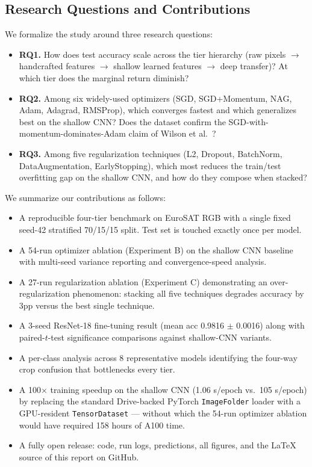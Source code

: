 \documentclass[10pt,letterpaper]{article}
\begin{document}
\subsection{Research Questions and Contributions}
We formalize the study around three research questions:
\begin{itemize}[leftmargin=2em]
    \item \textbf{RQ1.} How does test accuracy scale across the tier hierarchy (raw pixels $\rightarrow$ handcrafted features $\rightarrow$ shallow learned features $\rightarrow$ deep transfer)? At which tier does the marginal return diminish?
    \item \textbf{RQ2.} Among six widely-used optimizers (SGD, SGD+Momentum, NAG, Adam, Adagrad, RMSProp), which converges fastest and which generalizes best on the shallow CNN? Does the dataset confirm the SGD-with-momentum-dominates-Adam claim of Wilson et al.~\cite{wilson2017}?
    \item \textbf{RQ3.} Among five regularization techniques (L2, Dropout, BatchNorm, DataAugmentation, EarlyStopping), which most reduces the train/test overfitting gap on the shallow CNN, and how do they compose when stacked?
\end{itemize}

We summarize our contributions as follows:
\begin{itemize}[leftmargin=2em]
    \item A reproducible four-tier benchmark on EuroSAT RGB with a single fixed seed-42 stratified 70/15/15 split. Test set is touched exactly once per model.
    \item A 54-run optimizer ablation (Experiment B) on the shallow CNN baseline with multi-seed variance reporting and convergence-speed analysis.
    \item A 27-run regularization ablation (Experiment C) demonstrating an over-regularization phenomenon: stacking all five techniques degrades accuracy by 3pp versus the best single technique.
    \item A 3-seed ResNet-18 fine-tuning result (mean acc 0.9816 $\pm$ 0.0016) along with paired-$t$-test significance comparisons against shallow-CNN variants.
    \item A per-class analysis across 8 representative models identifying the four-way crop confusion that bottlenecks every tier.
    \item A 100$\times$ training speedup on the shallow CNN (1.06 s/epoch vs.\ 105 s/epoch) by replacing the standard Drive-backed PyTorch \texttt{ImageFolder} loader with a GPU-resident \texttt{TensorDataset} --- without which the 54-run optimizer ablation would have required 158 hours of A100 time.
    \item A fully open release: code, run logs, predictions, all figures, and the LaTeX source of this report on GitHub.
\end{itemize}
\end{document}
